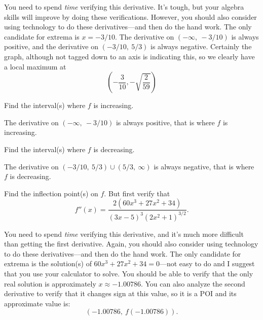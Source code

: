 \documentclass[12pt,addpoints, answers, fleqn]{exam}
\begin{document}
\begin{questions}
\begin{solution}
You need to spend \emph{time} verifying this derivative. It's tough, but your algebra skills will improve by doing these verifications. However, you should also consider using technology to do these derivatives---and then do the hand work. The only candidate for extrema is $x=-3/10$. The derivative on $\left(-\infty, \ -3/10 \right)$ is always positive, and the derivative on $\left( -3/10, \ 5/3 \right)$ is always negative. Certainly the graph, although not tagged down to an axis is indicating this, so we clearly have a local maximum at
\[
\left( -\frac{3}{10}, -\sqrt{\frac{2}{59}} \right)
\]
\end{solution}

\question Find the interval(s) where $f$ is increasing.

\begin{solution}
The derivative on $\left(-\infty, \ -3/10 \right)$ is always positive, that is where $f$ is increasing. 
\end{solution}

\question Find the interval(s) where $f$ is decreasing.
\begin{solution}
The derivative on $\left( -3/10, \ 5/3 \right) \cup \left( 5/3, \ \infty \right)$ is always negative, that is where $f$ is decreasing. 
\end{solution}

\question Find the inflection point(s) on $f$. But first verify that
\[
f''\left( x \right) = \frac{2\left(60 x^3 + 27x^2+34 \right)}{\left( 3x-5\right)^3\left(2x^2+1 \right)^{3/2}}.
\]

\begin{solution}
You need to spend \emph{time} verifying this derivative, and it's much more difficult than getting the first derivative. Again, you should also consider using technology to do these derivatives---and then do the hand work. The only candidate for extrema is the solution(s) of $60 x^3 + 27x^2+34=0$---not easy to do and I  suggest that you use your calculator to solve. You should be able to verify that the only real solution is approximately $x \approx -1.00786$. You can also analyze the second derivative to verify that it changes sign at this value, so it is a POI and its approximate value is:
\[
\left( -1.00786, \ f \left(-1.00786\right) \right).
\]

\end{solution}

\end{questions}
\end{document}
